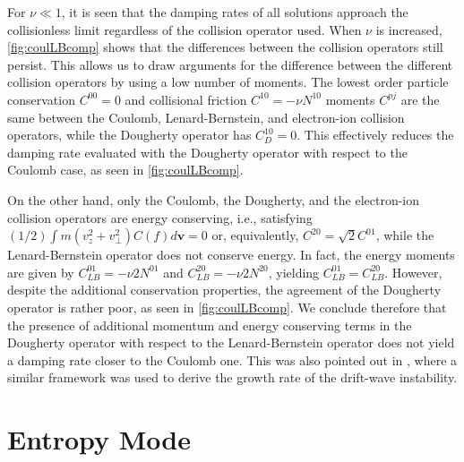 For $\nu\ll 1$, it is seen that the damping rates of all solutions approach the collisionless limit regardless of the collision operator used.
%
When $\nu$ is increased, \cref{fig:coulLBcomp} shows that the differences between the collision operators {still persist}.
%
This allows us to draw arguments for the difference between the different collision operators by using a low number of moments.
%
The lowest order {particle conservation} $C^{00}=0$ and {collisional friction} $C^{10}=-\nu N^{10}$ moments $C^{pj}$ are the same between the Coulomb, Lenard-Bernstein, and electron-ion collision operators, while the Dougherty operator has $C_D^{10}=0$.
%
This effectively reduces the damping rate {evaluated with the Dougherty operator with respect to the Coulomb case}, as seen in \cref{fig:coulLBcomp}.

%
On the other hand, only the Coulomb, the Dougherty, and the electron-ion collision operators are energy conserving, i.e., satisfying $(1/2)\int m (v_z^2+v_\perp^2) C(f) d \mathbf v=0$ or, equivalently, $C^{20}=\sqrt{2}C^{01}$, while the Lenard-Bernstein operator does not conserve energy.
%
In fact, the energy moments are given by $C_{LB}^{01}=-\nu 2 N^{01}$ and $C_{LB}^{20}=-\nu 2 N^{20}$, yielding $C_{LB}^{01}=C_{LB}^{20}$.
%
However, despite the additional conservation properties, the agreement of the Dougherty operator is rather poor, as seen in \cref{fig:coulLBcomp}.
%
We conclude therefore that the presence of additional momentum and energy conserving terms in the Dougherty operator with respect to the Lenard-Bernstein operator does not yield a damping rate closer to the Coulomb one.
%
This was also pointed out in \citet{Jorge2018}, where a similar framework was used to derive the growth rate of the drift-wave instability.

\section{Entropy Mode}
\label{sec:timeevol}

